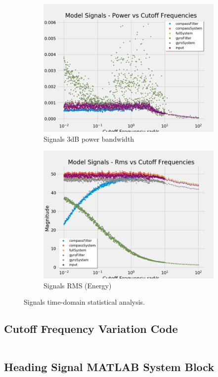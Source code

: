 \begin{figure}[H]
\begin{subfigure}{.5\textwidth}
  \centering
  \includegraphics[width=\linewidth, height=\paperheight/5]{img/iterable/modelSignals/modelpowerSignals.png}  
  \caption{Signals 3dB power bandwidth}
  \label{fig:model_power}
\end{subfigure}
\begin{subfigure}{.5\textwidth}
  \centering
  \includegraphics[width=\linewidth, height=\paperheight/5]{img/iterable/modelSignals/modelrmsSignals.png}  
  \caption{Signals RMS (Energy)}
  \label{fig:model_rms}
\end{subfigure}
\caption{Signals time-domain statistical analysis.}
\label{fig:sample_statistical_metrics}
\end{figure}

\subsection{Cutoff Frequency Variation Code}
\label{sec:cutoff_error_variation_code}
\inputminted{octave}{code/errorCutoffFrequencyVariation.m}

\subsection{Heading Signal MATLAB System Block}
\label{sec:heading_signal_code}
\inputminted{octave}{code/HeadingSignals.m}

